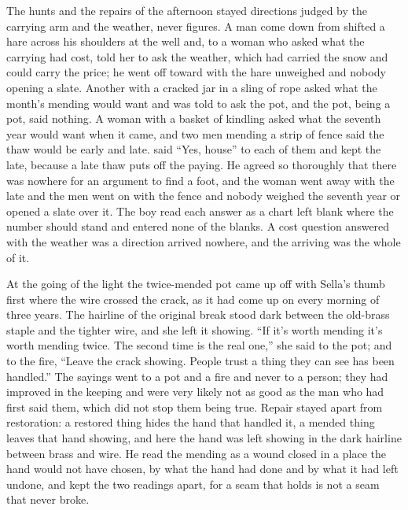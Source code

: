 The hunts and the repairs of the afternoon stayed directions judged by the carrying arm and the weather, never figures. A man come down from  shifted a hare across his shoulders at the well and, to a woman who asked what the carrying had cost, told her to ask the weather, which had carried the snow and could carry the price; he went off toward  with the hare unweighed and nobody opening a slate. Another with a cracked jar in a sling of rope asked what the month's mending would want and was told to ask the pot, and the pot, being a pot, said nothing. A woman with a basket of kindling asked what the seventh year would want when it came, and two men mending a strip of fence said the thaw would be early and late.  said “Yes, house” to each of them and kept the late, because a late thaw puts off the paying. He agreed so thoroughly that there was nowhere for an argument to find a foot, and the woman went away with the late and the men went on with the fence and nobody weighed the seventh year or opened a slate over it. The boy read each answer as a chart left blank where the number should stand and entered none of the blanks. A cost question answered with the weather was a direction arrived nowhere, and the arriving was the whole of it.

\scenebreak

At the going of the light the twice-mended pot came up off  with Sella's thumb first where the wire crossed the crack, as it had come up on every morning of three years. The hairline of the original break stood dark between the old-brass staple and the tighter wire, and she left it showing. “If it's worth mending it's worth mending twice. The second time is the real one,” she said to the pot; and to the fire, “Leave the crack showing. People trust a thing they can see has been handled.” The sayings went to a pot and a fire and never to a person; they had improved in the keeping and were very likely not as good as the man who had first said them, which did not stop them being true. Repair stayed apart from restoration: a restored thing hides the hand that handled it, a mended thing leaves that hand showing, and here the hand was left showing in the dark hairline between brass and wire. He read the mending as a wound closed in a place the hand would not have chosen, by what the hand had done and by what it had left undone, and kept the two readings apart, for a seam that holds is not a seam that never broke.

